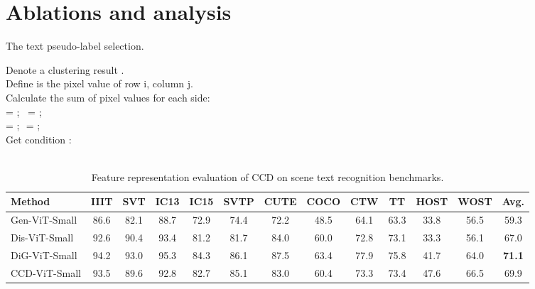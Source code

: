 \documentclass[10pt,twocolumn,letterpaper]{article}
\begin{document}
\section{Ablations and analysis}
\begin{algorithm}[t]
\small
     \caption{The text pseudo-label  selection.}
     \label{training_BoxDQN}
     Denote a clustering result .\\
    Define  is the pixel value of 
    row i, column j.\\
    Calculate the sum of pixel values for each side:\\
      = ;\,\,\,
      = ;\\
      = ;\,\,
      = ; \\
     Get condition :\\
     \\
     \eIf{:}
             {
                 
             }
             {
                 
             }
    \vspace{-0.2em}
\end{algorithm}
\begin{table*}[t]
  \centering
  \caption{Feature representation evaluation of CCD on scene text recognition benchmarks.}
    \begin{tabular}{l|ccccccccccc|c}
    \toprule
    Method & IIIT & SVT & IC13 & IC15 & SVTP & CUTE & COCO & CTW & TT &HOST &WOST &Avg.\\
    \midrule
    Gen-ViT-Small &86.6 &82.1 &88.7 &72.9 &74.4 & 72.2 &48.5&64.1 &63.3&33.8&56.5&59.3\\
    Dis-ViT-Small &92.6 &90.4 &93.4 &81.2 &81.7 & 84.0 &60.0&72.8 &73.1&33.3&56.1&67.0\\
    DiG-ViT-Small &94.2 &93.0 &95.3 &84.3 &86.1 &87.5&63.4&77.9 &75.8&41.7&64.0&\textbf{71.1}\\
    \rowcolor{mygray}
    CCD-ViT-Small &93.5 &89.6 &92.8 &82.7 &85.1 &83.0 &60.4 &73.3&73.4&47.6&66.5&69.9  \\
    \bottomrule
    \end{tabular}
  \label{tb:feature evaluation}
  \vspace{-0.5em}
  \end{table*}
\end{document}
